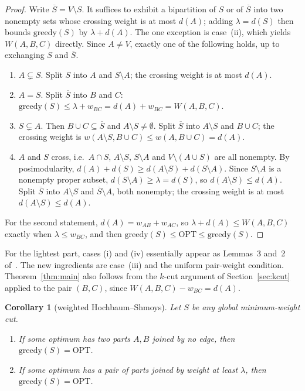 \documentclass[preprint,12pt]{elsarticle}
\newtheorem{corollary}[theorem]{Corollary}
\theoremstyle{definition}
\newcommand{\OPT}{\mathrm{OPT}}
\newcommand{\greedy}{\mathrm{greedy}}
\newcommand{\Sbar}{\overline{S}}
\begin{document}
\begin{proof}
Write $\Sbar=V\setminus S$. It suffices to exhibit a bipartition of $S$ or of $\Sbar$ into two nonempty
sets whose crossing weight is at most $d(A)$; adding $\lambda=d(S)$ then bounds $\greedy(S)$ by
$\lambda+d(A)$. The one exception is case~(ii), which yields $W(A,B,C)$ directly. Since $A\ne V$,
exactly one of the following holds, up to exchanging $S$ and $\Sbar$.
\begin{enumerate}[label=(\roman*),leftmargin=*]
\item $A\subsetneq S$. Split $S$ into $A$ and $S\setminus A$; the crossing weight is at most $d(A)$.
\item $A=S$. Split $\Sbar$ into $B$ and $C$: $\greedy(S)\le\lambda+w_{BC}=d(A)+w_{BC}=W(A,B,C)$.
\item $S\subsetneq A$. Then $B\cup C\subseteq\Sbar$ and $A\setminus S\ne\emptyset$. Split $\Sbar$ into
  $A\setminus S$ and $B\cup C$; the crossing weight is
  $w(A\setminus S,B\cup C)\le w(A,B\cup C)=d(A)$.
\item $A$ and $S$ cross, i.e.\ $A\cap S$, $A\setminus S$, $S\setminus A$ and $V\setminus(A\cup S)$ are
  all nonempty. By posimodularity, $d(A)+d(S)\ge d(A\setminus S)+d(S\setminus A)$. Since
  $S\setminus A$ is a nonempty proper subset, $d(S\setminus A)\ge\lambda=d(S)$, so
  $d(A\setminus S)\le d(A)$. Split $\Sbar$ into $A\setminus S$ and $\Sbar\setminus A$, both nonempty;
  the crossing weight is at most $d(A\setminus S)\le d(A)$.
\end{enumerate}
For the second statement, $d(A)=w_{AB}+w_{AC}$, so $\lambda+d(A)\le W(A,B,C)$ exactly when
$\lambda\le w_{BC}$, and then $\greedy(S)\le\OPT\le\greedy(S)$.
\end{proof}

For the lightest part, cases (i) and (iv) essentially appear as Lemmas~3 and~2 of~\cite{KamidoiWY2002}.
The new ingredients are case~(iii) and the uniform pair-weight condition.
Theorem~\ref{thm:main} also follows from the $k$-cut argument of Section~\ref{sec:kcut} applied to
the pair $(B,C)$, since $W(A,B,C)-w_{BC}=d(A)$.

\begin{corollary}[weighted Hochbaum--Shmoys]\label{cor:hs}
Let $S$ be any global minimum-weight cut.
\begin{enumerate}[label=(\alph*),leftmargin=*]
\item If some optimum has two parts $A,B$ joined by no edge, then $\greedy(S)=\OPT$.
\item If some optimum has a pair of parts joined by weight at least $\lambda$, then $\greedy(S)=\OPT$.
\end{enumerate}
\end{corollary}
\end{document}
